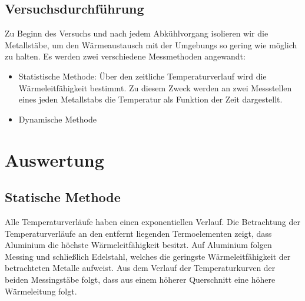 \subsection{Versuchsdurchführung}
\label{sec:1}
Zu Beginn des Versuchs und nach jedem Abkühlvorgang isolieren wir die Metallstäbe,
um den Wärmeaustausch mit der Umgebungs so gering wie möglich zu halten. Es werden
zwei verschiedene Messmethoden angewandt:
\begin{itemize}
  \item Statistische Methode:
    Über den zeitliche Temperaturverlauf wird die Wärmeleitfähigkeit bestimmt.
    Zu diesem Zweck werden an zwei Messstellen eines jeden Metallstabs die Temperatur
    als Funktion der Zeit dargestellt.
  \item Dynamische Methode
\end{itemize}
\section{Auswertung}
\subsection{Statische Methode}
Alle Temperaturverläufe haben einen exponentiellen Verlauf.
Die Betrachtung der Temperaturverläufe an den entfernt liegenden Termoelementen zeigt, dass Aluminium die höchste
Wärmeleitfähigkeit besitzt. Auf Aluminium folgen Messing und schließlich Edelstahl, welches die geringste Wärmeleitfähigkeit der
betrachteten Metalle aufweist. Aus dem Verlauf der Temperaturkurven der beiden Messingstäbe folgt, dass aus einem höherer Querschnitt
eine höhere Wärmeleitung folgt.

